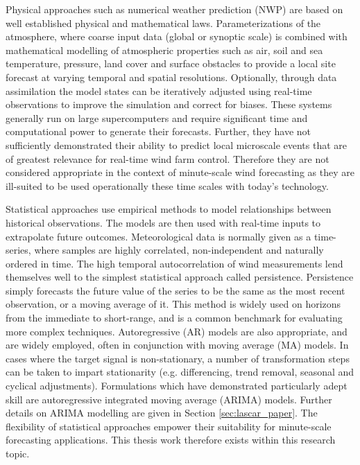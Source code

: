 Physical approaches such as numerical weather prediction (NWP) are based on well established physical and mathematical laws. Parameterizations of the atmosphere, where coarse input data (global or synoptic scale) is combined with mathematical modelling of atmospheric properties such as air, soil and sea temperature, pressure, land cover and surface obstacles to provide a local site forecast at varying temporal and spatial resolutions. Optionally, through data assimilation the model states can be iteratively adjusted using real-time observations to improve the simulation and correct for biases. These systems generally run on large supercomputers and require significant time and computational power to generate their forecasts. Further, they have not sufficiently demonstrated their ability to predict local microscale events that are of greatest relevance for real-time wind farm control. Therefore they are not considered appropriate in the context of minute-scale wind forecasting as they are ill-suited to be used operationally these time scales with today's technology.

Statistical approaches use empirical methods to model relationships between historical observations. The models are then used with real-time inputs to extrapolate future outcomes. Meteorological data is normally given as a time-series, where samples are highly correlated, non-independent and naturally ordered in time. The high temporal autocorrelation of wind measurements lend themselves well to the simplest statistical approach called persistence. Persistence simply forecasts the future value of the series to be the same as the most recent observation, or a moving average of it. This method is widely used on horizons from the immediate to short-range, and is a common benchmark for evaluating more complex techniques. Autoregressive (AR) models are also appropriate, and are widely employed, often in conjunction with moving average (MA) models. In cases where the target signal is non-stationary, a number of transformation steps can be taken to impart stationarity (e.g. differencing, trend removal, seasonal and cyclical adjustments). Formulations which have demonstrated particularly adept skill are autoregressive integrated moving average (ARIMA) models. Further details on ARIMA modelling are given in Section \ref{sec:lascar_paper}. The flexibility of statistical approaches empower their suitability for minute-scale forecasting applications. This thesis work therefore exists within this research topic.

